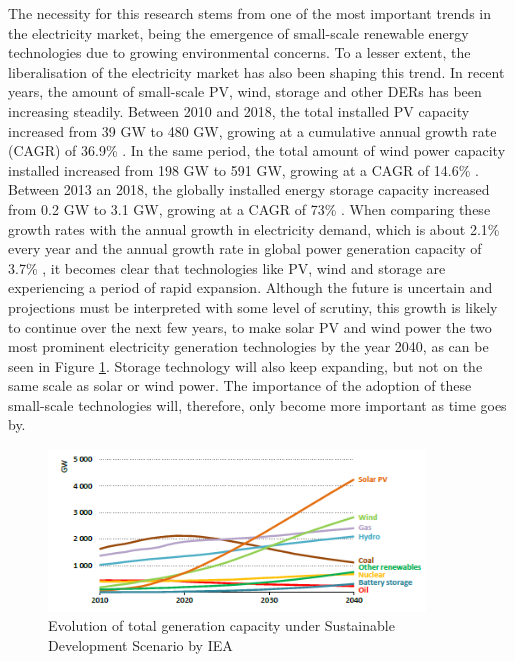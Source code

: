 The necessity for this research stems from one of the most important trends in the electricity market, being the emergence of small-scale renewable energy technologies due to growing environmental concerns. To a lesser extent, the liberalisation of the electricity market has also been shaping this trend. In recent years, the amount of small-scale PV, wind, storage and other DERs has been increasing steadily. Between 2010 and 2018, the total installed PV capacity increased from 39 GW to 480 GW, growing at a cumulative annual growth rate (CAGR) of 36.9\% \cite{PVevolution}. In the same period, the total amount of wind power capacity installed increased from 198 GW to 591 GW, growing at a CAGR of 14.6\% \cite{Wind18}. Between 2013 an 2018, the globally installed energy storage capacity increased from 0.2 GW to 3.1 GW, growing at a CAGR of 73\% \cite{Storage}. When comparing these growth rates with the annual growth in electricity demand, which is about 2.1\% every year and the annual growth rate in global power generation capacity of 3.7\% \cite{WEO} \cite{WEO20}, it becomes clear that technologies like PV, wind and storage are experiencing a period of rapid expansion. Although the future is uncertain and projections must be interpreted with some level of scrutiny, this growth is likely to continue over the next few years, to make solar PV and wind power the two most prominent electricity generation technologies by the year 2040, as can be seen in Figure \ref{Figure:global}. Storage technology will also keep expanding, but not on the same scale as solar or wind power. The importance of the adoption of these small-scale technologies will, therefore, only become more important as time goes by.
\newline 
\begin{figure}[h!]
\centering
\includegraphics[width=10cm]{GlobalEnergy.PNG}
\caption[Evolution of total generation capacity under Sustainable Development Scenario by IEA]{Evolution of total generation capacity under Sustainable Development Scenario by IEA \cite{WEO}}
\label{Figure:global}
\end{figure}
\newline 

